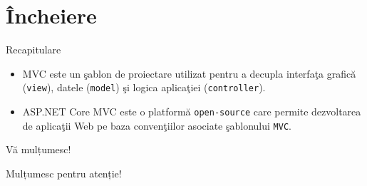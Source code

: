\documentclass[presentation]{beamer}
\begin{document}
\section{Încheiere}
\label{sec:orgb6547f6}
\begin{frame}[label={sec:orge88a95d},fragile]{Recapitulare}
 \begin{itemize}
\item \alert{MVC} este un şablon de proiectare utilizat pentru a decupla interfaţa grafică (\texttt{view}), datele (\texttt{model}) şi logica aplicaţiei (\texttt{controller}).
\item \alert{ASP.NET Core MVC} este o platformă \texttt{open-source} care permite dezvoltarea de aplicaţii Web pe baza convenţiilor asociate şablonului \texttt{MVC}.
\end{itemize}
\end{frame}
\begin{frame}[label={sec:orgfd045ee}]{Vă mulțumesc!}
\begin{center}
Mulțumesc pentru atenție!
\end{center}
\end{frame}
\end{document}

